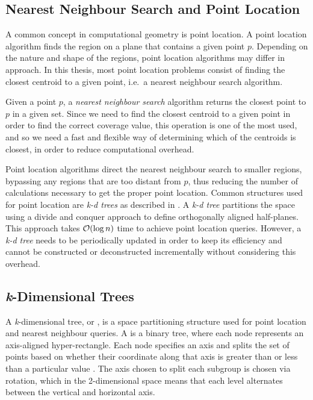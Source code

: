 \subsection{Nearest Neighbour Search and Point Location}
A common concept in computational geometry is point location. A point location algorithm finds the region on a plane that contains a given point $p$. Depending on the nature and shape of the regions, point location algorithms may differ in approach. In this thesis, most point location problems consist of finding the closest centroid to a given point, i.e.\ a nearest neighbour search algorithm.

Given a point $p$, a \emph{nearest neighbour search} algorithm returns the closest point to $p$ in a given set. Since we need to find the closest centroid to a given point in order to find the correct coverage value, this operation is one of the most used, and so we need a fast and flexible way of determining which of the centroids is closest, in order to reduce computational overhead. 

Point location algorithms direct the nearest neighbour search to smaller regions, bypassing any regions that are too distant from $p$, thus reducing the number of calculations necessary to get the proper point location.
Common structures used for point location are \emph{k-d trees} as described in \citet{incrementalcov}. A \emph{k-d tree} partitions the space using a divide and conquer approach to define orthogonally aligned half-planes. This approach takes $\mathcal{O}(\log{n})$ time to achieve point location queries. However, a \emph{k-d tree} needs to be periodically updated in order to keep its efficiency and cannot be constructed or deconstructed incrementally without considering this overhead.

\subsection{\textit{k}-Dimensional Trees}

A \textit{k}-dimensional tree, or \kdtree, is a space partitioning structure used for point location and nearest neighbour queries. A \kdtree is a binary tree, where each node represents an axis-aligned hyper-rectangle. Each node specifies an axis and splits the set of points based on whether their coordinate along that axis is greater than or less than a particular value \cite{kdtrees}. 
The axis chosen to split each subgroup is chosen via rotation, which in the 2-dimensional space means that each level alternates between the vertical and horizontal axis.

